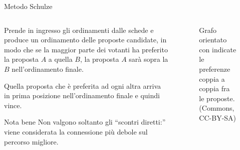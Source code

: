 \begin{frame}{Metodo Schulze}
\begin{columns}
\begin{column}{.666\textwidth}
Prende in ingresso gli ordinamenti dalle schede e produce un ordinamento delle proposte candidate, in modo che se la maggior parte dei votanti ha preferito la proposta $A$ a quella $B$, la proposta $A$ sarà sopra la $B$ nell'ordinamento finale.

\alert{Quella proposta che è preferita ad ogni altra arriva in prima posizione  nell'ordinamento finale e quindi vince}.

\begin{block}{Nota bene}
Non valgono soltanto gli ``scontri diretti:'' viene considerata la connessione più debole sul percorso migliore.
\end{block}
\end{column}
\begin{column}{.333\textwidth}
\begin{figure}[hbp!]
\caption{Grafo orientato con indicate le preferenze coppia a coppia fra le proposte. (Commons, CC-BY-SA)}
\end{figure}
\end{column}
\end{columns}
\end{frame}
